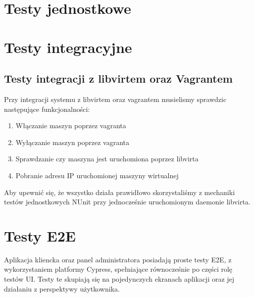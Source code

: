 \documentclass[12pt]{article}
\begin{document}

\tableofcontents

\newpage

\section{Testy jednostkowe}

\section{Testy integracyjne}

\subsection {Testy integracji z libvirtem oraz Vagrantem}
Przy integracji systemu z libvirtem oraz vagrantem musielismy sprawdzic następujące funkcjonalności:
\begin{enumerate}
	\item Włączanie maszyn poprzez vagranta
	\item Wyłączanie maszyn poprzez vagranta
	\item Sprawdzanie czy maszyna jest uruchomiona poprzez libvirta
	\item Pobranie adresu IP uruchomionej maszyny wirtualnej
\end{enumerate}

Aby upewnić się, że wszystko działa prawidłowo skorzystaliśmy z mechaniki testów jednostkowych NUnit przy jednocześnie uruchomionym daemonie libvirta.

\section{Testy E2E}
Aplikacja kliencka oraz panel administratora posiadają proste testy E2E, z wykorzystaniem platformy Cypress, spełniające równocześnie po części rolę testów UI. Testy te skupiają się na pojedynczych ekranach aplikacji oraz jej działaniu z perspektywy użytkownika.
\end{document}
